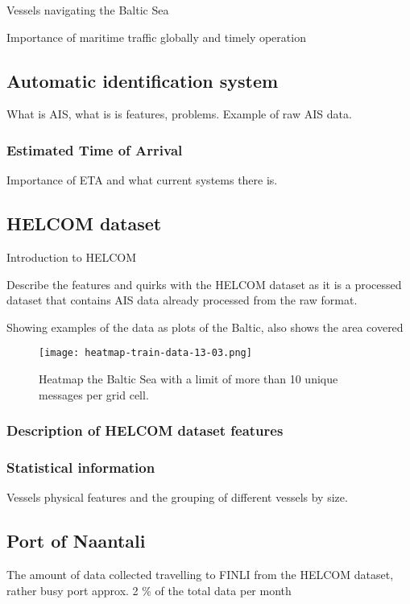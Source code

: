 \documentclass[../main.tex]{subfiles}
\begin{document}
Vessels navigating the Baltic Sea

Importance of maritime traffic globally and timely operation


\subsection{Automatic identification system}

What is AIS, what is is features, problems. Example of raw AIS data.

\subsubsection{Estimated Time of Arrival}

Importance of ETA and what current systems there is.

\subsection{HELCOM dataset}

Introduction to HELCOM

Describe the features and quirks with the HELCOM dataset as it is a processed dataset that contains AIS data already processed from the raw format.

Showing examples of the data as plots of the Baltic, also shows the area covered

\begin{figure}[h]
\centering
\texttt{[image: heatmap-train-data-13-03.png]}
\caption{Heatmap the Baltic Sea with a limit of more than 10 unique messages per grid cell.}
\label{fig:heatmap}
\end{figure}

\subsubsection{Description of HELCOM dataset features}

\subsubsection{Statistical information}

Vessels physical features and the grouping of different vessels by size.

\subsection{Port of Naantali}

The amount of data collected travelling to FINLI from the HELCOM dataset, rather busy port approx. 2 \% of the total data per month
\end{document}
